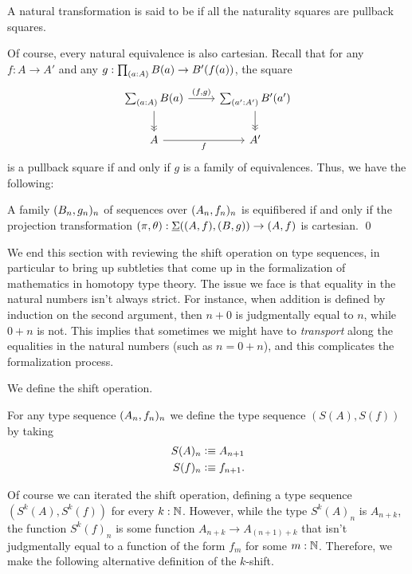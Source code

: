 \begin{defn}
A natural transformation is said to be  if all the naturality squares are pullback squares.
\end{defn}

Of course, every natural equivalence is also cartesian. Recall that for any $f:A\to A'$ and any $g:\prd{a:A}B(a)\to B'(f(a))$, the square
\begin{equation*}
\begin{tikzcd}
\sm{a:A}B(a) \arrow[r,"\pairr{f,g}"] \arrow[d,->>] & \sm{a':A'}B'(a') \arrow[d,->>] \\
A \arrow[r,swap,"f"] & A'
\end{tikzcd}
\end{equation*}
is a pullback square if and only if $g$ is a family of equivalences. Thus, we have the following:

\begin{lem}
A family $({B}_{n},{g}_{n})_{n}$ of sequences over $({A}_{n},{f}_{n})_{n}$ is equifibered if and only if the projection transformation $(\pi,\theta):\underline{\Sigma}((A,f),(B,g))\to (A,f)$ is cartesian. \qed
\end{lem}

We end this section with reviewing the shift operation on type sequences, in particular to bring up subtleties that come up in the formalization of mathematics in homotopy type theory. The issue we face is that equality in the natural numbers isn't always strict. For instance, when addition is defined by induction on the second argument, then $n+0$ is judgmentally equal to $n$, while $0+n$ is not. This implies that sometimes we might have to \emph{transport} along the equalities in the natural numbers (such as $n=0+n$), and this complicates the formalization process.

We define the shift operation.
\begin{defn}
For any type sequence $({A}_{n},{f}_{n})_{n}$ we define the type sequence $(S(A),S(f))$ by taking
\begin{align*}
S(A)_n & \vcentcolon\equiv A_{n+1} \\
S(f)_n & \vcentcolon\equiv f_{n+1}.
\end{align*}
\end{defn}

Of course we can iterated the shift operation, defining a type sequence $(S^k(A),S^k(f))$ for every $k:\mathbb{N}$. However, while the type $S^k(A)_n$ is $A_{n+k}$, the function $S^k(f)_n$ is some function $A_{n+k}\to A_{(n+1)+k}$ that isn't judgmentally equal to a function of the form $f_m$ for some $m:\mathbb{N}$. Therefore, we make the following alternative definition of the $k$-shift.

